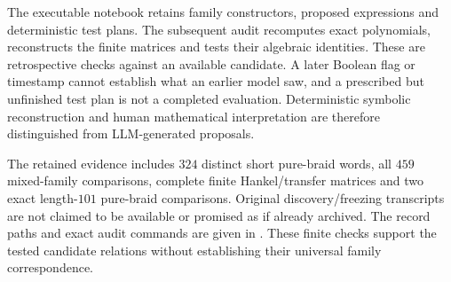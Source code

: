 The executable notebook retains family constructors, proposed expressions and deterministic test plans. The subsequent audit recomputes exact polynomials, reconstructs the finite matrices and tests their algebraic identities. These are retrospective checks against an available candidate. A later Boolean flag or timestamp cannot establish what an earlier model saw, and a prescribed but unfinished test plan is not a completed evaluation. Deterministic symbolic reconstruction and human mathematical interpretation are therefore distinguished from LLM-generated proposals.

The retained evidence includes $324$ distinct short pure-braid words, all $459$ mixed-family comparisons, complete finite Hankel/transfer matrices and two exact length-$101$ pure-braid comparisons. Original discovery/freezing transcripts are not claimed to be available or promised as if already archived. The record paths and exact audit commands are given in . These finite checks support the tested candidate relations without establishing their universal family correspondence.

